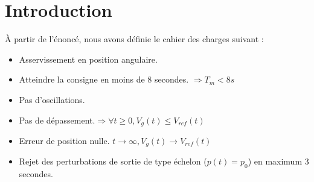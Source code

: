 \chapter*{Introduction}
\label{chap:Intro}

À partir de l'énoncé, nous avons définie le cahier des charges suivant :
\begin{itemize}
\item Asservissement en position angulaire.
\item Atteindre la consigne en moins de 8 secondes. $\Rightarrow T_m<8s $
\item Pas d'oscillations.
\item Pas de dépassement.$\Rightarrow \forall t \geq 0, V_g(t)\leq V_{ref}(t)$
\item Erreur de position nulle. $ t\rightarrow \infty, V_g(t) \rightarrow V_{ref}(t)$
\item Rejet des perturbations de sortie de type échelon ($p(t)=p_0$) en maximum 3 secondes.
\end{itemize}
